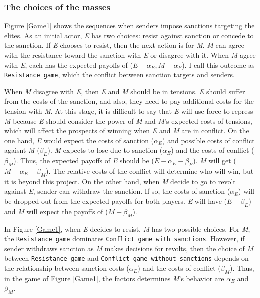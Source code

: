 \documentclass[11pt]{article}
\begin{document}
\subsubsection*{The choices of the masses}

Figure \ref{Game1} shows the sequences when senders impose sanctions targeting the elites. As an initial actor, \textit{E} has two choices: resist against sanction or concede to the sanction. If \textit{E} chooses to resist, then the next action is for \textit{M}. \textit{M} can agree with the resistance toward the sanction with \textit{E} or disagree with it. When \textit{M} agree with \textit{E}, each has the expected payoffs of ($E - \alpha_E, M - \alpha_{E}$). I call this outcome as \texttt{Resistance game}, which the conflict between sanction targets and senders.
	
When \textit{M} disagree with \textit{E}, then \textit{E} and \textit{M} should be in tensions. \textit{E} should suffer from the costs of the sanction, and also, they need to pay additional costs for the tension with \textit{M}. At this stage, it is difficult to say that \textit{E} will use force to repress \textit{M} because \textit{E} should consider the power of \textit{M} and \textit{M}'s expected costs of tensions, which will affect the prospects of winning when \textit{E} and \textit{M} are in conflict. On the one hand, \textit{E} would expect the costs of sanction ($\alpha_{E}$) and possible costs of conflict agaisnt \textit{M} ($\beta_{E}$). \textit{M} expects to lose due to sanction ($\alpha_{E}$) and the costs of conflict ($\beta_{M}$). Thus, the expected payoffs of \textit{E} should be ($E - \alpha_{E}- \beta_{E}$). \textit{M} will get ($M-\alpha_{E}-\beta_{M}$). The relative costs of the conflict will determine who will win, but it is beyond this project. On the other hand, when \textit{M} decide to go to revolt against \textit{E}, sender can withdraw the sanction. If so, the costs of sanction ($\alpha_{E}$) will be dropped out from the expected payoffs for both players. \textit{E} will have ($E-\beta_{E}$) and \textit{M} will expect the payoffs of ($M-\beta_{M}$).

In Figure \ref{Game1}, when \textit{E} decides to resist, \textit{M} has two possible choices. For \textit{M}, the \texttt{Resistance game} dominates \texttt{Conflict game with sanctions}. However, if sender withdraws sanction as \textit{M} makes decisions for revolts, then the choice of \textit{M} between \texttt{Resistance game} and \texttt{Conflict game without sanctions} depends on the relationship between sanction costs ($\alpha_{E}$)  and the costs of conflict ($\beta_{M}$). Thus, in the game of Figure \ref{Game1}, the factors determines \textit{M}'s behavior are $\alpha_{E}$ and $\beta_{M}$.
\end{document}
